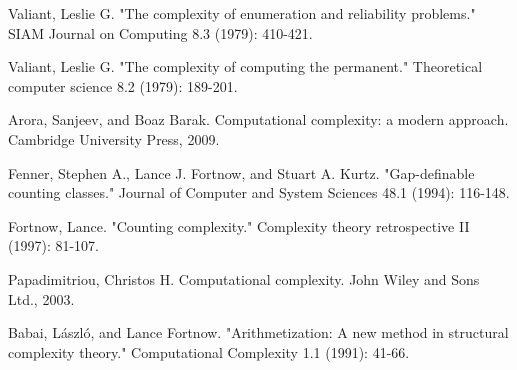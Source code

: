 \documentclass[paper=a4, fontsize=11pt]{scrartcl} %
\numberwithin{equation}{subsection}
\numberwithin{figure}{subsection}
\numberwithin{table}{subsection}
\numberwithin{definition}{subsection}
\numberwithin{theorem}{subsection}
\numberwithin{property}{subsection}
\numberwithin{proposition}{subsection}
\begin{document}
\pagebreak
\begin{thebibliography}{1}

 Valiant, Leslie G. "The complexity of enumeration and reliability problems." SIAM Journal on Computing 8.3 (1979): 410-421.

 Valiant, Leslie G. "The complexity of computing the permanent." Theoretical computer science 8.2 (1979): 189-201.

 Arora, Sanjeev, and Boaz Barak. Computational complexity: a modern approach. Cambridge University Press, 2009.

 Fenner, Stephen A., Lance J. Fortnow, and Stuart A. Kurtz. "Gap-definable counting classes." Journal of Computer and System Sciences 48.1 (1994): 116-148.

 Fortnow, Lance. "Counting complexity." Complexity theory retrospective II (1997): 81-107.

 Papadimitriou, Christos H. Computational complexity. John Wiley and Sons Ltd., 2003.

 Babai, László, and Lance Fortnow. "Arithmetization: A new method in structural complexity theory." Computational Complexity 1.1 (1991): 41-66.

\end{thebibliography}
\end{document}

